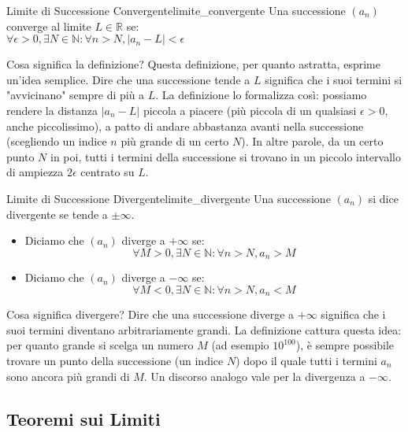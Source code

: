 \begin{definition}{Limite di Successione Convergente}{limite_convergente}
    Una successione $(a_n)$ converge al limite $L \in \mathbb{R}$ se:
    \\[1em]
    $\forall \epsilon > 0, \exists N \in \mathbb{N} : \forall n > N, |a_n - L| < \epsilon$
\end{definition}

\begin{explanation}{Cosa significa la definizione?}{}
    Questa definizione, per quanto astratta, esprime un'idea semplice. Dire che una successione tende a $L$ significa che i suoi termini si "avvicinano" sempre di più a $L$.
    La definizione lo formalizza così: possiamo rendere la distanza $|a_n - L|$ piccola a piacere (più piccola di un qualsiasi $\epsilon > 0$, anche piccolissimo), a patto di andare abbastanza avanti nella successione (scegliendo un indice $n$ più grande di un certo $N$). In altre parole, da un certo punto $N$ in poi, tutti i termini della successione si trovano in un piccolo intervallo di ampiezza $2\epsilon$ centrato su $L$.
\end{explanation}

\begin{definition}{Limite di Successione Divergente}{limite_divergente}
    Una successione $(a_n)$ si dice divergente se tende a $\pm\infty$.
    \begin{itemize}
        \item Diciamo che $(a_n)$ diverge a $+\infty$ se:
         $$ \forall M > 0, \exists N \in \mathbb{N} : \forall n > N, a_n > M $$
        \item Diciamo che $(a_n)$ diverge a $-\infty$ se:
         $$ \forall M < 0, \exists N \in \mathbb{N} : \forall n > N, a_n < M $$
    \end{itemize}
\end{definition}

\begin{explanation}{Cosa significa divergere?}{}
    Dire che una successione diverge a $+\infty$ significa che i suoi termini diventano arbitrariamente grandi. La definizione cattura questa idea: per quanto grande si scelga un numero $M$ (ad esempio $10^{100}$), è sempre possibile trovare un punto della successione (un indice $N$) dopo il quale tutti i termini $a_n$ sono ancora più grandi di $M$. Un discorso analogo vale per la divergenza a $-\infty$.
\end{explanation}

\subsection{Teoremi sui Limiti}


